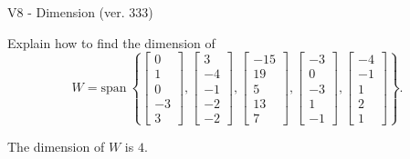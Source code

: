 \begin{exercise}
  \begin{exerciseTitle}V8 - Dimension (ver. 333)\end{exerciseTitle}
  \begin{exerciseStatement}
    Explain how to find the dimension of 
\[W=\mathrm{span}\ \left\{\left[\begin{array}{r}
0 \\
1 \\
0 \\
-3 \\
3
\end{array}\right] , \left[\begin{array}{r}
3 \\
-4 \\
-1 \\
-2 \\
-2
\end{array}\right] , \left[\begin{array}{r}
-15 \\
19 \\
5 \\
13 \\
7
\end{array}\right] , \left[\begin{array}{r}
-3 \\
0 \\
-3 \\
1 \\
-1
\end{array}\right] , \left[\begin{array}{r}
-4 \\
-1 \\
1 \\
2 \\
1
\end{array}\right]\right\}.\]



  \end{exerciseStatement}
  \begin{exerciseAnswer}
   The dimension of \(W\) is  \(4\).
  


  \end{exerciseAnswer}
\end{exercise}